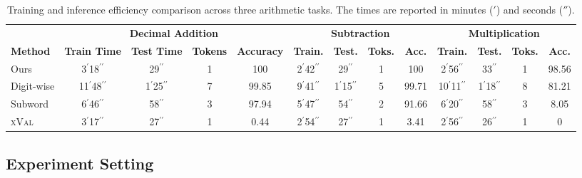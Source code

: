 \ifdefined\isarxiv
\else
\begin{table*}[h!]
\centering
\setlength{\tabcolsep}{3pt}  %
\caption{Training and inference efficiency comparison across three arithmetic tasks. The times are reported in minutes (\('\)) and seconds (\(''\)).}
\begin{tabular}{lcccc cccc cccc}
\toprule
 & \multicolumn{4}{c}{\textbf{Decimal Addition}} & \multicolumn{4}{c}{\textbf{Subtraction}} & \multicolumn{4}{c}{\textbf{Multiplication}} \\
\cmidrule(lr){2-5}\cmidrule(lr){6-9}\cmidrule(lr){10-13}
\textbf{Method} & \textbf{Train Time} & \textbf{Test Time} & \textbf{Tokens} & \textbf{Accuracy} & \textbf{Train.} & \textbf{Test.} & \textbf{Toks.} & \textbf{Acc.} & \textbf{Train.} & \textbf{Test.} & \textbf{Toks.} & \textbf{Acc.} \\
\midrule
Ours       & 3\(^{\prime}\)18\(^{\prime\prime}\) & 29\(^{\prime\prime}\) & 1 & 100 &
             2\(^{\prime}\)42\(^{\prime\prime}\) & 29\(^{\prime\prime}\) & 1 &  100 &
             2\(^{\prime}\)56\(^{\prime\prime}\) & 33\(^{\prime\prime}\) & 1 &  98.56   \\
Digit-wise & 11\(^{\prime}\)48\(^{\prime\prime}\) & 1\(^{\prime}\)25\(^{\prime\prime}\) & 7 & 99.85 &
             9\(^{\prime}\)41\(^{\prime\prime}\) & 1\(^{\prime}\)15\(^{\prime\prime}\) & 5 & 99.71 &
             10\(^{\prime}\)11\(^{\prime\prime}\) & 1\(^{\prime}\)18\(^{\prime\prime}\) & 8 &   81.21 \\
Subword    & 6\(^{\prime}\)46\(^{\prime\prime}\) & 58\(^{\prime\prime}\) & 3 & 97.94 &
             5\(^{\prime}\)47\(^{\prime\prime}\) & 54\(^{\prime\prime}\) & 2 & 91.66 &
             6\(^{\prime}\)20\(^{\prime\prime}\) & 58\(^{\prime\prime}\) & 3 & 8.05  \\
\textsc{xVal}       & 3\(^{\prime}\)17\(^{\prime\prime}\) & 27\(^{\prime\prime}\) & 1 & 0.44 &
             2\(^{\prime}\)54\(^{\prime\prime}\) & 27\(^{\prime\prime}\) & 1 & 3.41 &
             2\(^{\prime}\)56\(^{\prime\prime}\) & 26\(^{\prime\prime}\) & 1 & 0  \\
\bottomrule
\end{tabular}

\label{tab:time_comparison}
\end{table*}

\fi




\subsection{Experiment Setting}
\label{sec:exp_setting}

